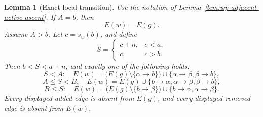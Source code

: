 \documentclass[11pt]{article}
\newtheorem{lemma}[theorem]{Lemma}
\theoremstyle{definition}
\begin{document}
\begin{lemma}[Exact local transition]
\label{lem:wp-local-transition}
Use the notation of Lemma~\ref{lem:wp-adjacent-active-ascent}. If \(A=b\),
then
\begin{equation}
   E(w)=E(g).
   \label{eq:wp-transition-identity}
\end{equation}
Assume \(A>b\). Let \(c=s_w(b)\), and define
\begin{equation}
   S=
   \begin{cases}
      c+n,&c<a,\\
      c,&c>b.
   \end{cases}
   \label{eq:wp-S-lift}
\end{equation}
Then \(b<S<a+n\), and exactly one of the following holds:
\begin{equation}
   S<A:\quad
   E(w)
   =
   \bigl(E(g)\setminus\{\alpha\to b\}\bigr)
   \cup\{\alpha\to\beta,\beta\to b\},
   \label{eq:wp-transition-left}
\end{equation}
\begin{equation}
   A\le S<B:\quad
   E(w)
   =
   E(g)\cup\{b\to\alpha,\alpha\to\beta,\beta\to b\},
   \label{eq:wp-transition-triangle}
\end{equation}
\begin{equation}
   B\le S:\quad
   E(w)
   =
   \bigl(E(g)\setminus\{b\to\beta\}\bigr)
   \cup\{b\to\alpha,\alpha\to\beta\}.
   \label{eq:wp-transition-right}
\end{equation}
Every displayed added edge is absent from \(E(g)\), and every displayed
removed edge is absent from \(E(w)\).
\end{lemma}
\end{document}
